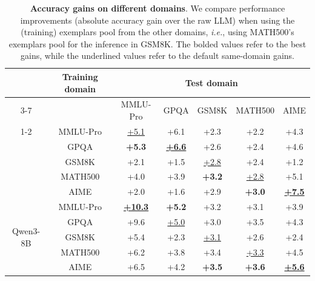 \begin{table}[ht]
\caption{
{\bf Accuracy gains on different domains}. 
We compare performance improvements (absolute accuracy gain over the raw LLM) when using the (training) exemplars pool from the other domains, {\it i.e.},
using MATH500's exemplars pool for the inference in GSM8K.
The bolded values refer to the best gains, while the underlined values refer to the default same-domain gains.
}
\label{app-tab: cross-domain}
\centering
\small
\begin{tabular}{@{}ccccccc@{}}
\toprule
\multirow{2}{*}{} & \multirow{2}{*}{Training domain} & \multicolumn{5}{c}{Test domain} \\ \cmidrule(l){3-7} 
 &  & MMLU-Pro & GPQA & GSM8K & MATH500 & AIME \\ \cmidrule(r){1-2}
\multirow{5}{*}{Qwen3-4B} & MMLU-Pro & \underline{+5.1} & +6.1 & +2.3 & +2.2 & +4.3 \\
 & GPQA & {\bf +5.3} & {\underline {\bf +6.6}} & +2.6 & +2.4 & +4.6 \\
 & GSM8K & +2.1 & +1.5 & \underline{+2.8} & +2.4 & +1.2 \\
 & MATH500 & +4.0 & +3.9 & {\bf +3.2} & \underline{+2.8} & +5.1 \\
 & AIME & +2.0 & +1.6 & +2.9 & {\bf +3.0} & {\underline {\bf +7.5}} \\ \midrule
\multirow{5}{*}{Qwen3-8B} & MMLU-Pro & {\underline {\bf +10.3}} & {\bf +5.2} & +3.2 & +3.1 & +3.9 \\
 & GPQA & +9.6 & \underline{+5.0} & +3.0 & +3.5 & +4.3 \\
 & GSM8K & +5.4 & +2.3 & \underline{+3.1} & +2.6 & +2.4 \\
 & MATH500 & +6.2 & +3.8 & +3.4 & \underline{+3.3} & +4.5 \\
 & AIME & +6.5 & +4.2 & {\bf +3.5} & {\bf +3.6} & {\underline {\bf +5.6}} \\ \bottomrule
\end{tabular}
\end{table}


